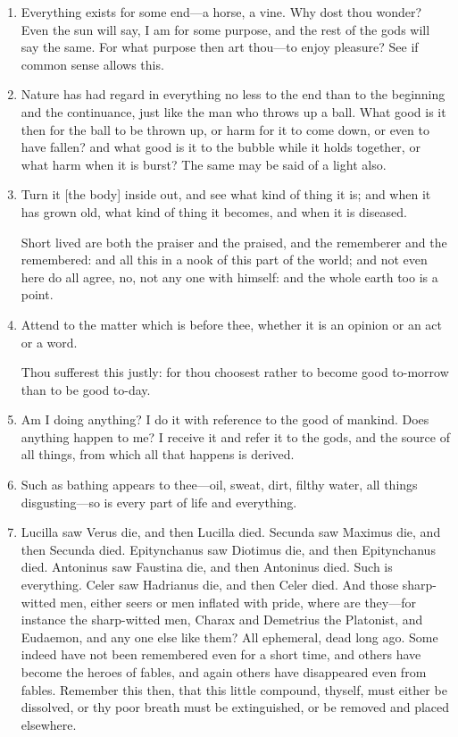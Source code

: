 \begin{enumerate}
\item Everything exists for some end—a horse, a vine. Why dost thou wonder? Even the sun will say, I am for some purpose, and the rest of the gods will say the same. For what purpose then art thou—to enjoy pleasure? See if common sense allows this.

\item Nature has had regard in everything no less to the end than to the beginning and the continuance, just like the man who throws up a ball. What good is it then for the ball to be thrown up, or harm for it to come down, or even to have fallen? and what good is it to the bubble while it holds together, or what harm when it is burst? The same may be said of a light also.

\item Turn it [{\clarify the body}] inside out, and see what kind of thing it is; and when it has grown old, what kind of thing it becomes, and when it is diseased.

Short lived are both the praiser and the praised, and the rememberer and the remembered: and all this in a nook of this part of the world; and not even here do all agree, no, not any one with himself: and the whole earth too is a point.

\item Attend to the matter which is before thee, whether it is an opinion or an act or a word.

Thou sufferest this justly: for thou choosest rather to become good to-morrow than to be good to-day.

\item Am I doing anything? I do it with reference to the good of mankind. Does anything happen to me? I receive it and refer it to the gods, and the source of all things, from which all that happens is derived.

\item Such as bathing appears to thee—oil, sweat, dirt, filthy water, all things disgusting—so is every part of life and everything.

\item Lucilla saw Verus die, and then Lucilla died. Secunda saw Maximus die, and then Secunda died. Epitynchanus saw Diotimus die, and then Epitynchanus died. Antoninus saw Faustina die, and then Antoninus died. Such is everything. Celer saw Hadrianus die, and then Celer died. And those sharp-witted men, either seers or men inflated with pride, where are they—for instance the sharp-witted men, Charax and Demetrius the Platonist, and Eudaemon, and any one else like them? All ephemeral, dead long ago. Some indeed have not been remembered even for a short time, and others have become the heroes of fables, and again others have disappeared even from fables. Remember this then, that this little compound, thyself, must either be dissolved, or thy poor breath must be extinguished, or be removed and placed elsewhere.


\end{enumerate}

